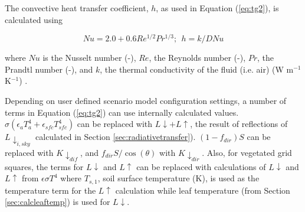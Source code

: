 \documentclass[final,3p,times,authoryear]{elsarticle}
\begin{document}
%
%
%
%

The convective heat transfer coefficient, $h$, as used in Equation (\ref{eq:tg2}), is calculated using 

\begin{equation}\label{eq:h}
Nu = 2.0 + 0.6Re^{1/2}Pr^{1/3};  ~~h = k / D Nu
\end{equation}

where $Nu$ is the Nusselt number (-),
$Re$, the Reynolds number (-),
$Pr$, the Prandtl number (-), and 
$k$, the thermal conductivity of the fluid (i.e. air) (W m$^{-1}$K$^{-1}$) \citep{Liljegren2008}.



Depending on user defined scenario model configuration settings, a number of terms in Equation (\ref{eq:tg2}) can use internally calculated values. $\sigma (\epsilon_{a} T_{a}^{4} + \epsilon_{sfc} T_{sfc}^{4} )$ can be replaced with $L\downarrow + L\uparrow$, the result of reflections of $L \downarrow_{i,sky}$ calculated in Section \ref{sec:radiativetransfer}). $(1-f_{dir})S$ can be replaced with $K \downarrow_{dif}$, and $f_{dir}S/ \cos(\theta)$ with $K \downarrow_{dir}$. Also, for vegetated grid squares, the terms for $L\downarrow$ and $L\uparrow$ can be replaced with calculations of $L\downarrow$ and $L\uparrow$ from $\epsilon \sigma T^{4}$ where $T_{s,1}$, soil surface temperature (K), is used as the temperature term for the $L\uparrow$ calculation while leaf temperature (from Section \ref{sec:calcleaftemp}) is used for $L\downarrow$. 
\end{document}
